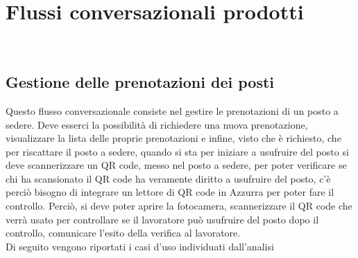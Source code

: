 
\chapter{Flussi conversazionali prodotti}
\label{cap:flussi di conversazione}

\\

\section{Gestione delle prenotazioni dei posti}
Questo flusso conversazionale consiste nel gestire le prenotazioni di un posto a sedere. Deve esserci la possibilità di richiedere una nuova prenotazione, visualizzare la lista delle proprie prenotazioni e infine, visto che è richiesto, che per riscattare il posto a sedere, quando si sta per iniziare a usufruire del posto si deve scannerizzare un QR code, messo nel posto a sedere, per poter verificare se chi ha scansionato il QR code ha veramente diritto a usufruire del posto, c'è perciò bisogno di integrare un lettore di QR code in Azzurra per poter fare il controllo. Perciò, si deve poter aprire la fotocamera, scannerizzare il QR code che verrà usato per controllare se il lavoratore può usufruire del posto dopo il controllo, comunicare l'esito della verifica al lavoratore. \\
Di seguito vengono riportati i casi d'uso individuati dall'analisi
